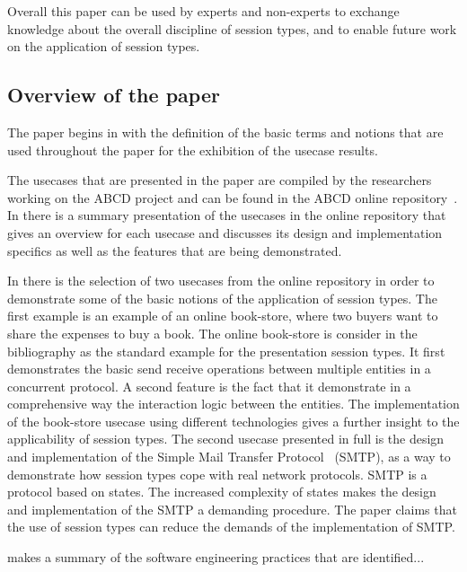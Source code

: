 Overall this paper can be used by experts and non-experts
to exchange knowledge about the overall discipline of session types,
and to enable future work on the application of session types.


\subsection{Overview of the paper}

The paper begins in 
with the definition of the basic terms and notions
that are used throughout the paper for the exhibition of the usecase
results.

The usecases that are presented in the paper are compiled by the researchers
working on the ABCD project and can be found in the ABCD online repository~\cite{usecase_repository}.
In  there is a summary presentation
of the usecases in the online repository that gives an overview
for each usecase and discusses its design and implementation specifics
as well as the features that are being demonstrated.

In  there is the selection of two
usecases from the online repository in order to demonstrate
some of the basic notions of the application of session types.
The first example is an example of an online book-store,
where two buyers want to share the expenses to buy a book.
The online book-store is consider in the bibliography as the
standard example for the presentation session types.
It first demonstrates the basic send receive operations
between multiple entities in a concurrent protocol. A second
feature is the fact that it demonstrate in a comprehensive
way the interaction logic between the entities.
The implementation of the book-store usecase using different
technologies gives a further insight to the applicability of
session types.
The second usecase presented in full is the design and implementation
of the Simple Mail Transfer Protocol~\cite{citation_needed} (SMTP),
as a way to demonstrate how session types cope with real network
protocols. SMTP is a protocol based on states. The increased complexity
of states makes the design and implementation of the SMTP a demanding
procedure. The paper claims that the use of session types can reduce
the demands of the implementation of SMTP.

 makes a summary of the software engineering
practices that are identified... 



